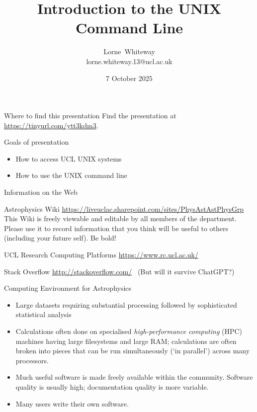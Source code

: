 \documentclass[dvipsnames]{beamer}
\title{Introduction to the UNIX Command Line}
\author{Lorne~Whiteway \\ lorne.whiteway.13@ucl.ac.uk}
\institute{Astrophysics Group\\  Department of Physics and Astronomy\\  University College London}
\date{7 October 2025}
\begin{document}
\frame{\titlepage}

\begin{frame}{Where to find this presentation}
    Find the presentation at \alert{\url{https://tinyurl.com/ytt3kdm3}}.\\
\end{frame}


\begin{frame}{Goals of presentation}
  \begin{itemize}
    \item How to access UCL UNIX systems
    \item How to use the UNIX command line
  \end{itemize}
\end{frame}


\begin{frame}{Information on the Web}
  \begin{block}{Astrophysics Wiki}
    \url{https://liveuclac.sharepoint.com/sites/PhysAstAstPhysGrp}
    This Wiki is freely viewable and editable by all members of the department. Please use it to record information that you think will be useful to others (including your future self). Be bold!
  \end{block}
  \begin{block}{UCL Research Computing Platforms}
    \url{https://www.rc.ucl.ac.uk/}
  \end{block}
  \begin{block}{Stack Overflow}
    \url{http://stackoverflow.com/}  \ (But will it survive ChatGPT?)
  \end{block}
\end{frame}


\begin{frame}{Computing Environment for Astrophysics}
  \begin{itemize}
  \item Large datasets requiring substantial processing followed by sophisticated statistical analysis
  \item Calculations often done on specialised \textit{high-performance computing} (HPC) machines having large filesystems and large RAM; calculations are often broken into pieces that can be run simultaneously (`in parallel') across many processors.
  \item Much useful software is made freely available within the community. Software quality is usually high; documentation quality is more variable.
  \item Many users write their own software.
  \end{itemize}
\end{frame}
\end{document}
